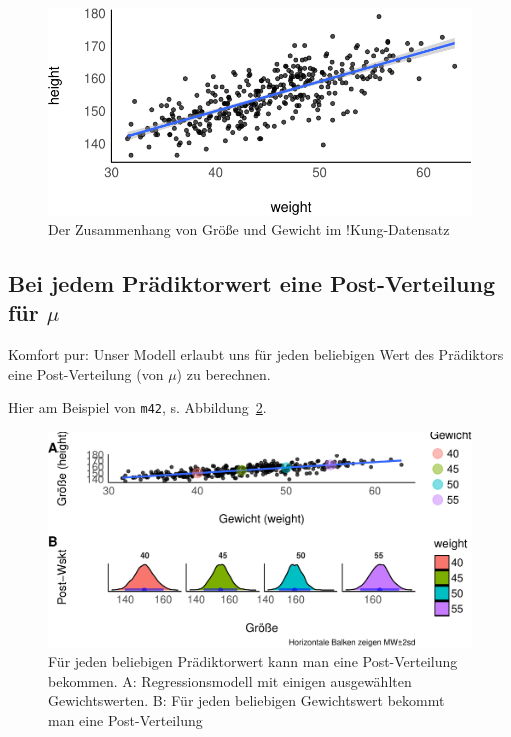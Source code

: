 \documentclass[
  a4paper,
  DIV=11]{scrreprt}
\theoremstyle{definition}
\theoremstyle{remark}
\begin{document}
\begin{figure}[H]

{\centering \includegraphics{./lineare-modelle_files/figure-pdf/fig-kung-zshg-1.pdf}

}

\caption{\label{fig-kung-zshg}Der Zusammenhang von Größe und Gewicht im
!Kung-Datensatz}

\end{figure}

\hypertarget{bei-jedem-pruxe4diktorwert-eine-post-verteilung-fuxfcr-mu}{%
\subsection{\texorpdfstring{Bei jedem Prädiktorwert eine Post-Verteilung
für
\(\mu\)}{Bei jedem Prädiktorwert eine Post-Verteilung für \textbackslash mu}}\label{bei-jedem-pruxe4diktorwert-eine-post-verteilung-fuxfcr-mu}}

Komfort pur: Unser Modell erlaubt uns für jeden beliebigen Wert des
Prädiktors eine Post-Verteilung (von \(\mu\)) zu berechnen.

Hier am Beispiel von \texttt{m42}, s. Abbildung~\ref{fig-post42}.

\begin{figure}

{\centering \includegraphics[width=1\textwidth,height=\textheight]{./lineare-modelle_files/figure-pdf/fig-post42-1.pdf}

}

\caption{\label{fig-post42}Für jeden beliebigen Prädiktorwert kann man
eine Post-Verteilung bekommen. A: Regressionsmodell mit einigen
ausgewählten Gewichtswerten. B: Für jeden beliebigen Gewichtswert
bekommt man eine Post-Verteilung}

\end{figure}
\end{document}
